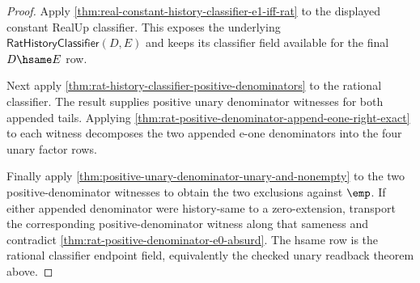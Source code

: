 \begin{proof}
Apply \autoref{thm:real-constant-history-classifier-e1-iff-rat} to the
displayed constant RealUp classifier. This exposes the underlying
$\mathsf{RatHistoryClassifier}(D,E)$ and keeps its classifier field available
for the final $D\hsame E$ row.

Next apply \autoref{thm:rat-history-classifier-positive-denominators} to the
rational classifier. The result supplies positive unary denominator witnesses
for both appended tails. Applying
\autoref{thm:rat-positive-denominator-append-eone-right-exact} to each
witness decomposes the two appended e-one denominators into the four unary
factor rows.

Finally apply \autoref{thm:positive-unary-denominator-unary-and-nonempty} to
the two positive-denominator witnesses to obtain the two exclusions against
$\emp$. If either appended denominator were history-same to a zero-extension,
transport the corresponding positive-denominator witness along that sameness
and contradict \autoref{thm:rat-positive-denominator-e0-absurd}. The hsame row
is the rational classifier endpoint field, equivalently the checked unary
readback theorem above.
\end{proof}

